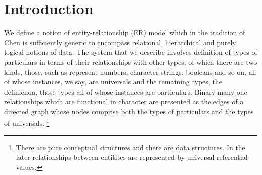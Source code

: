  \section{Introduction}

We  define a notion of entity-relationship (ER) model which in the tradition of Chen\cite{Chen1976} is sufficiently generic to encompass relational, hierarchical and purely logical  notions of data.
The system that we describe involves definition of types of particulars in terms of their relationships with other types, of which there are two kinds, those, such as represent numbers, character strings, booleans and so on, all of whose instances, we say, are universals and the remaining types, the definienda, those types all of whose instances are particulars. Binary many-one relationships which are functional in character are presented as the edges of a directed graph whose nodes comprise both the types of particulars and the types of universals. \footnote{There are pure conceptual structures and there are data structures. In the later relationships between entitites are represented by universal
referential values.}

